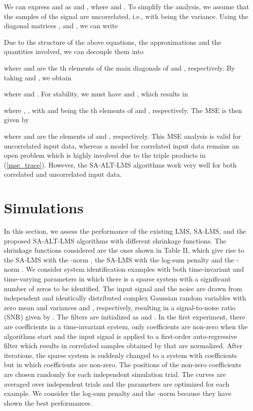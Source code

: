 \documentclass[10pt,onecolumn]{IEEEtran}
\begin{document}
We can express  and  as
 and , where  and . To simplify the
analysis, we assume that the samples of the signal  are uncorrelated, i.e.,  with  being the variance. Using the
diagonal matrices ,  and , we can write


Due to the structure of the above equations, the approximations and
the quantities involved, we can decouple them into


where  and  are the th elements of the main
diagonals of  and ,
respectively. By taking 
and , we obtain


where  and . For
stability, we must have  and , which results in

where , , with  and  being the
th elements of  and ,
respectively. The MSE is then given by

where  and  are the elements of  and , respectively. This MSE
analysis is valid for uncorrelated input data, whereas a model for
correlated input data remains an open problem which is highly
involved due to the triple products in (\ref{mse_trace}). However,
the SA-ALT-LMS algorithms work very well for both correlated and
uncorrelated input data.

\section{Simulations}

In this section, we assess the performance of the existing LMS,
SA-LMS, and the proposed SA-ALT-LMS algorithms with different
shrinkage functions. The shrinkage functions considered are the ones
shown in Table II, which give rise to the SA-LMS with the -norm
\cite{chen}, {the SA-LMS with the log-sum penalty
\cite{chen,eksioglu,candes} and the -norm \cite{gu,eksioglu2}.}
We consider system identification examples with both time-invariant
and time-varying parameters in which there is a sparse system with a
significant number of zeros to be identified. The input signal
 and the noise  are drawn
from independent and identically distributed complex Gaussian random
variables with zero mean and variances  and
, respectively, resulting in a signal-to-noise ratio
(SNR) given by . {The filters are
initialized as  and
.} In the first experiment,
there are  coefficients in a time-invariant system, only 
coefficients are non-zero when the algorithms start and the input
signal is applied to a first-order auto-regressive filter which
results in correlated samples obtained by  that are normalized. After  iterations, the sparse
system is suddenly changed to a system with  coefficients but
in which  coefficients are non-zero. The positions of the
non-zero coefficients are chosen randomly for each independent
simulation trial. The curves are averaged over  independent
trials and the parameters are optimized for each example. {We
consider the log-sum penalty \cite{chen,eksioglu,candes} and the
-norm \cite{gu,eksioglu2} because they have shown the best
performances.}
\end{document}
